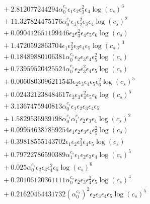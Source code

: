 \documentclass[10pt]{article}
\begin{document}
\begin{align*}
&{}  + 2.812077244294 \alpha_{0}^{c_s} \epsilon_{1} \epsilon_{2} \epsilon_{3}^{2} \epsilon_{4} \log{\left(c_{s} \right)}^{3} \\
&{}  + 11.327824475176 \alpha_{0}^{c_s} \epsilon_{1} \epsilon_{2}^{2} \epsilon_{3} \epsilon_{4} \log{\left(c_{s} \right)}^{2} \\
&{}  + 0.090412651199446 \epsilon_{2} \epsilon_{3}^{2} \epsilon_{4} \epsilon_{5} \epsilon_{6} \log{\left(c_{s} \right)} \\
&{}  + 1.4720592863704 \epsilon_{1} \epsilon_{2}^{2} \epsilon_{3} \epsilon_{4} \epsilon_{5} \log{\left(c_{s} \right)}^{3} \\
&{}  + 0.18489880106381 \alpha_{0}^{c_s} \epsilon_{2} \epsilon_{3} \epsilon_{4} \epsilon_{5}^{2} \log{\left(c_{s} \right)} \\
&{}  + 0.73959520425524 \alpha_{0}^{c_s} \epsilon_{2} \epsilon_{3}^{2} \epsilon_{4} \epsilon_{5} \log{\left(c_{s} \right)} \\
&{}  + 0.0060803096211543 \epsilon_{2} \epsilon_{3} \epsilon_{4} \epsilon_{5} \epsilon_{6}^{2} \log{\left(c_{s} \right)}^{5} \\
&{}  + 0.024321238484617 \epsilon_{2} \epsilon_{3} \epsilon_{4}^{2} \epsilon_{5} \epsilon_{6} \log{\left(c_{s} \right)}^{5} \\
&{}  + 3.1367475940813 \alpha_{0}^{c_s} \epsilon_{1} \epsilon_{2} \epsilon_{3} \epsilon_{4} \epsilon_{5} \\
&{}  + 1.5829536939198 \alpha_{0}^{c_s} \alpha_{1}^{c_s} \epsilon_{2} \epsilon_{3} \epsilon_{4} \log{\left(c_{s} \right)}^{2} \\
&{}  + 0.099546387859254 \epsilon_{1} \epsilon_{2} \epsilon_{3} \epsilon_{4} \epsilon_{5}^{2} \log{\left(c_{s} \right)} \\
&{}  + 0.39818555143702 \epsilon_{1} \epsilon_{2} \epsilon_{3}^{2} \epsilon_{4} \epsilon_{5} \log{\left(c_{s} \right)} \\
&{}  + 0.79722786590389 \alpha_{1}^{c_s} \epsilon_{1} \epsilon_{2} \epsilon_{3} \epsilon_{4} \log{\left(c_{s} \right)}^{5} \\
&{}  + 0.025 \alpha_{0}^{c_s} \epsilon_{2} \epsilon_{3} \epsilon_{4}^{2} \epsilon_{5} \log{\left(c_{s} \right)}^{6} \\
&{}  + 0.20106120361111 \alpha_{0}^{c_s} \epsilon_{2} \epsilon_{3} \epsilon_{4}^{2} \epsilon_{5} \log{\left(c_{s} \right)}^{4} \\
&{}  + 0.21620464431732 \left(\alpha_{0}^{c_s}\right)^{2} \epsilon_{2} \epsilon_{3} \epsilon_{4} \epsilon_{5} \log{\left(c_{s} \right)}^{5} \\

\end{align*}
\end{document}
